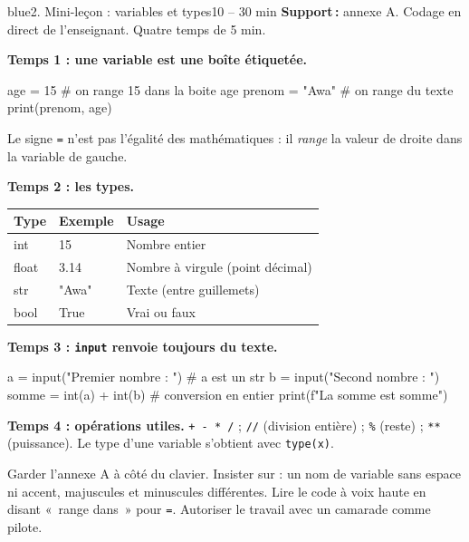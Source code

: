 \documentclass[11pt,a4paper]{article}
\begin{document}
\begin{etape}{blue}{2. Mini-leçon : variables et types}{10 -- 30 min}
\textbf{Support\,:} annexe A. Codage en direct de l'enseignant. Quatre temps de 5 min.

\textbf{Temps 1 : une variable est une boîte étiquetée.}
\begin{python}[Affectation]
age = 15            # on range 15 dans la boite age
prenom = "Awa"      # on range du texte
print(prenom, age)
\end{python}
Le signe \texttt{=} n'est pas l'égalité des mathématiques : il \emph{range} la valeur de droite dans la variable de gauche.

\textbf{Temps 2 : les types.}
\begin{center}
\begin{tabularx}{\linewidth}{>{\ttfamily}p{1.8cm}Y Y}
\toprule
Type & Exemple & Usage\\
\midrule
int & 15 & Nombre entier\\
float & 3.14 & Nombre à virgule (point décimal)\\
str & "Awa" & Texte (entre guillemets)\\
bool & True & Vrai ou faux\\
\bottomrule
\end{tabularx}
\end{center}

\textbf{Temps 3 : \texttt{input} renvoie toujours du texte.}
\begin{python}[Conversion]
a = input("Premier nombre : ")   # a est un str
b = input("Second nombre : ")
somme = int(a) + int(b)          # conversion en entier
print(f"La somme est {somme}")
\end{python}

\textbf{Temps 4 : opérations utiles.} \texttt{+ - * /} ; \texttt{//} (division entière) ; \texttt{\%} (reste) ; \texttt{**} (puissance). Le type d'une variable s'obtient avec \texttt{type(x)}.

\begin{astuce}
Garder l'annexe A à côté du clavier. Insister sur : un nom de variable sans espace ni accent, majuscules et minuscules différentes. Lire le code à voix haute en disant «~range dans~» pour \texttt{=}. Autoriser le travail avec un camarade comme pilote.
\end{astuce}
\end{etape}
\end{document}
